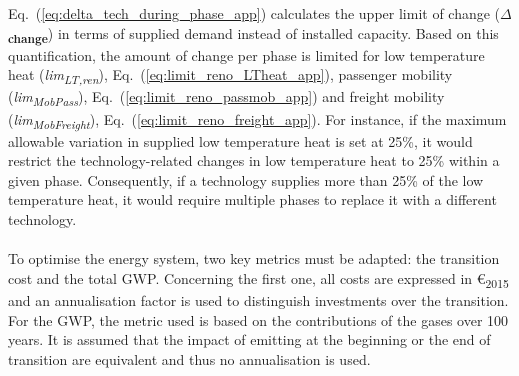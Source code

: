 Eq.~(\ref{eq:delta_tech_during_phase_app}) calculates the upper limit of change (\textbf{$\Delta$\textsubscript{change}}) in terms of supplied demand instead of installed capacity. 
Based on this quantification, the amount of change per phase is limited for low temperature heat (\emph{lim\textsubscript{LT,ren}}), Eq.~(\ref{eq:limit_reno_LTheat_app}), passenger mobility (\emph{lim\textsubscript{MobPass}}), Eq.~(\ref{eq:limit_reno_passmob_app}) and freight mobility (\emph{lim\textsubscript{MobFreight}}), Eq.~(\ref{eq:limit_reno_freight_app}). 
For instance, if the maximum allowable variation in supplied low temperature heat is set at 25\%, it would restrict the technology-related changes in low temperature heat to 25\% within a given phase. Consequently, if a technology supplies more than 25\% of the low temperature heat, it would require multiple phases to replace it with a different technology.\\


\\

\noindent
To optimise the energy system, two key metrics must be adapted: the transition cost and the total \acrfull{GWP}. 
Concerning the first one, all costs are expressed in €\textsubscript{2015} and an annualisation factor is used to distinguish investments over the transition. For the \gls{GWP}, the metric used is based on the contributions of the gases over 100 years. It is assumed that the impact of emitting at the beginning or the end of transition are equivalent and thus no annualisation is used. 


